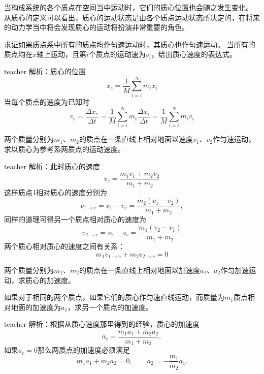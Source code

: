当构成系统的各个质点在空间当中运动时，它们的质心位置也会随之发生变化。
从质心的定义可以看出，质心的运动状态是由各个质点运动状态所决定的，在将来的动力学当中将会发现质心的运动将扮演非常重要的角色。




\begin{example}
求证如果质点系中所有的质点均作匀速运动时，其质心也作匀速运动。
当所有的质点均在$x$轴上运动，且第$i$个质点的运动速为$v_i$，给出质心速度的表达式。
\begin{taggedblock}{teacher}
\newline
解析：质心的位置
\[x_c =\frac{1}{M} \sum_{i=i}^{N}m_ix_i\]
当每个质点的速度为已知时
\[
v_c = \frac{\Delta x_c}{\Delta t} = \frac{1}{M}\sum_{i=i}^{N}m_i\frac{\Delta x_i}{\Delta t} = \frac{1}{M}\sum_{i=i}^{N}m_iv_i
\]
\end{taggedblock}
\end{example}

\begin{example}
两个质量分别为$m_1$、$m_2$的质点在一条直线上相对地面以速度$v_1$、$v_2$作匀速运动，求以质心为参考系两质点的运动速度。
\begin{taggedblock}{teacher}
\newline
解析：此时质心的速度
\[
v_c = \frac{m_1v_1+m_2v_2}{m_1+m_2}
\]
这样质点1相对质心的速度分别为
\[
v_{1\rightarrow c} = v_1-v_c = \frac{m_2(v_1-v_2)}{m_1+m_2},
\]
同样的道理可得另一个质点相对质心的速度为
\[
v_{2\rightarrow c} = v_2-v_c = \frac{m_1(v_2-v_1)}{m_1+m_2}
\]
两个质心相对质心的速度之间有关系：
\[
m_1v_{1\rightarrow c}+m_2v_{2\rightarrow c} = 0
\]
\end{taggedblock}
\end{example}

\begin{example}
两个质量分别为$m_1$、$m_2$的质点在一条直线上相对地面以加速度$a_1$、$a_2$作匀加速运动，求质心的加速度。

如果对于相同的两个质点，如果它们的质心作匀速直线运动，而质量为$m_1$质点相对地面的加速度为$a_1$，求另一个质点的加速度。
\begin{taggedblock}{teacher}
\newline
解析：根据从质心速度那里得到的经验，质心的加速度
\[
a_c = \frac{m_1a_1+m_2a_2}{m_1+m_2},
\]
如果$a_c = 0$那么两质点的加速度必须满足
\[
m_1a_1+m_2a_2 = 0,\qquad a_2 = -\frac{m_1}{m_2}a_1.
\]
\end{taggedblock}
\end{example}




